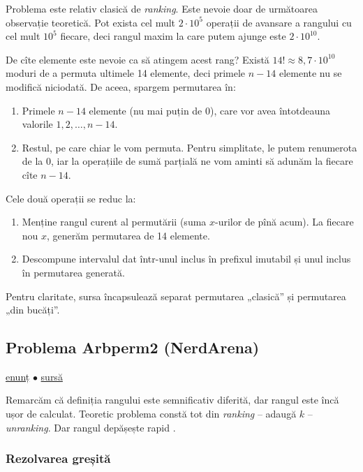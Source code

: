 \documentclass[../main.tex]{subfiles}
\begin{document}
Problema este relativ clasică de \textit{ranking}. Este nevoie doar de următoarea observație teoretică. Pot exista cel mult $2 \cdot 10^5$ operații de avansare a rangului cu cel mult $10^5$ fiecare, deci rangul maxim la care putem ajunge este $2 \cdot 10^{10}$.

De cîte elemente este nevoie ca să atingem acest rang? Există $14! \approx 8,7 \cdot 10^{10}$ moduri de a permuta ultimele 14 elemente, deci primele $n-14$ elemente nu se modifică niciodată.  De aceea, spargem permutarea în:

\begin{enumerate}
  \item Primele $n-14$ elemente (nu mai puțin de 0), care vor avea întotdeauna valorile $1, 2, \dots, n-14$.

  \item Restul, pe care chiar le vom permuta. Pentru simplitate, le putem renumerota de la 0, iar la operațiile de sumă parțială ne vom aminti să adunăm la fiecare cîte $n-14$.
\end{enumerate}

Cele două operații se reduc la:

\begin{enumerate}
  \item Menține rangul curent al permutării (suma $x$-urilor de pînă acum). La fiecare nou $x$, generăm permutarea de 14 elemente.

  \item Descompune intervalul dat într-unul inclus în prefixul imutabil și unul inclus în permutarea generată.
\end{enumerate}

Pentru claritate, sursa încapsulează separat permutarea „clasică” și permutarea „din bucăți”.

\subsection{Problema Arbperm2 (NerdArena)}
\label{problem:arbperm2}

\href{https://www.nerdarena.ro/problema/arbperm2}{enunț}
$\bullet$
\hyperref[code:arbperm2]{sursă}

Remarcăm că definiția rangului este semnificativ diferită, dar rangul este încă ușor de calculat. Teoretic problema constă tot din \textit{ranking} -- adaugă $k$ -- \textit{unranking}. Dar rangul depășește rapid .

\subsubsection*{Rezolvarea greșită}
\end{document}
